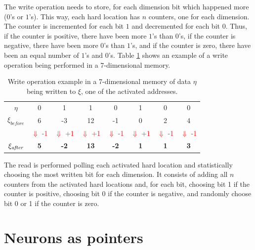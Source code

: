 The write operation needs to store, for each dimension bit which happened more ($0$'s or $1$'s). This way, each hard location has $n$ counters, one for each dimension. The counter is incremented for each bit $1$ and decremented for each bit $0$. Thus, if the counter is positive, there have been more $1$'s than $0$'s, if the counter is negative, there have been more $0$'s than $1$'s, and if the counter is zero, there have been an equal number of $1$'s and $0$'s. Table \ref{tab:write operation} shows an example of a write operation being performed in a 7-dimensional memory.

\begin{table}
\begin{tabular}{c|c|c|c|c|c|c|c|}
\cline{2-8}
$\eta$ & 0 & 1 & 1 & 0 & 1 & 0 & 0\tabularnewline
\cline{2-8}
$\xi_{\textit{before}}$ & 6 & -3 & 12 & -1 & 0 & 2 & 4\tabularnewline
\cline{2-8}
\multicolumn{1}{c}{} & \multicolumn{1}{c}{\textcolor{red}{\small{}$\Downarrow$ -1}} & \multicolumn{1}{c}{\textcolor{red}{\small{}$\Downarrow$ +1}} & \multicolumn{1}{c}{\textcolor{red}{\small{}$\Downarrow$ +1}} & \multicolumn{1}{c}{\textcolor{red}{\small{}$\Downarrow$ -1}} & \multicolumn{1}{c}{\textcolor{red}{\small{}$\Downarrow$ +1}} & \multicolumn{1}{c}{\textcolor{red}{\small{}$\Downarrow$ -1}} & \multicolumn{1}{c}{\textcolor{red}{\small{}$\Downarrow$ -1}}\tabularnewline
\cline{2-8}
$\xi_{\textit{\textit{after}}}$ & \textbf{5} & \textbf{-2} & \textbf{13} & \textbf{-2} & \textbf{1} & \textbf{1} & \textbf{3}\tabularnewline
\cline{2-8}
\end{tabular}

\caption{Write operation example in a 7-dimensional memory of data $\eta$
being written to $\xi$, one of the activated addresses.\label{tab:write operation}}


\end{table}


The read is performed polling each activated hard location and statistically choosing the most written bit for each dimension. It consists of adding all $n$ counters from the activated hard locations and, for each bit, choosing bit 1 if the counter is positive, choosing bit 0 if the counter is negative, and randomly choose bit 0 or 1 if the counter is zero.


\section{Neurons as pointers}

